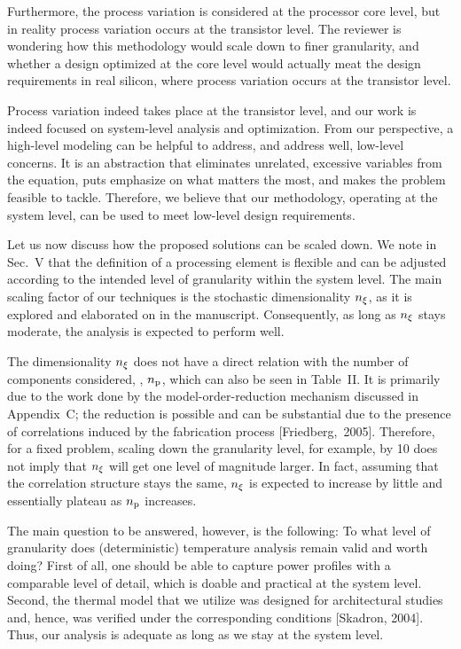 \begin{reviewer}
Furthermore, the process variation is considered at the processor core level,
but in reality process variation occurs at the transistor level. The reviewer
is wondering how this methodology would scale down to finer granularity, and
whether a design optimized at the core level would actually meat the design
requirements in real silicon, where process variation occurs at the transistor
level.
\end{reviewer}

\begin{authors}
Process variation indeed takes place at the transistor level, and our work is
indeed focused on system-level analysis and optimization. From our perspective,
a high-level modeling can be helpful to address, and address well, low-level
concerns. It is an abstraction that eliminates unrelated, excessive variables
from the equation, puts emphasize on what matters the most, and makes the
problem feasible to tackle. Therefore, we believe that our methodology,
operating at the system level, can be used to meet low-level design
requirements.

Let us now discuss how the proposed solutions can be scaled down. We note in
Sec.~V that the definition of a processing element is flexible and can be
adjusted according to the intended level of granularity within the system
level. The main scaling factor of our techniques is the stochastic
dimensionality ${n_\xi}$, as it is explored and elaborated on in the manuscript.
Consequently, as long as ${n_\xi}$ stays moderate, the analysis is expected to
perform well.

The dimensionality ${n_\xi}$ does not have a direct relation with the number of
components considered, \ie, ${n_\text{p}}$, which can also be seen in Table~II. It
is primarily due to the work done by the model-order-reduction mechanism
discussed in Appendix~C; the reduction is possible and can be substantial due
to the presence of correlations induced by the fabrication process
[Friedberg,~2005]. Therefore, for a fixed problem, scaling down the granularity
level, for example, by 10 does not imply that ${n_\xi}$ will get one level of
magnitude larger. In fact, assuming that the correlation structure stays the
same, ${n_\xi}$ is expected to increase by little and essentially plateau as
${n_\text{p}}$ increases.

The main question to be answered, however, is the following: To what level of
granularity does (deterministic) temperature analysis remain valid and worth
doing? First of all, one should be able to capture power profiles with a
comparable level of detail, which is doable and practical at the system level.
Second, the thermal model that we utilize was designed for architectural
studies and, hence, was verified under the corresponding conditions [Skadron,
2004]. Thus, our analysis is adequate as long as we stay at the system level.


\end{authors}
